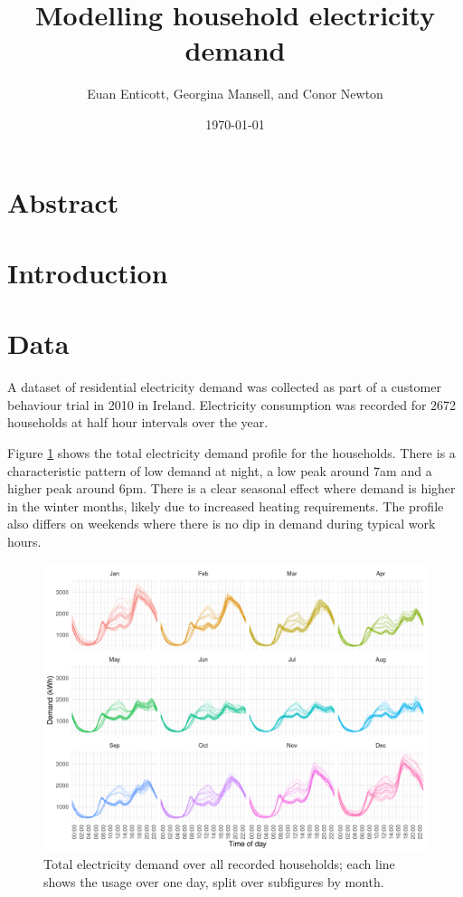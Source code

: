 \documentclass[11pt,a4paper]{article}
\begin{document}
\title{Modelling household electricity demand}
\author{Euan Enticott, Georgina Mansell, and Conor Newton}
\date{\today}

\maketitle
 
\section*{Abstract}


\section{Introduction}

\section{Data} \label{data}
A dataset of residential electricity demand was collected as part of a customer behaviour trial in 2010 in Ireland. Electricity consumption was recorded for 2672 households at half hour intervals over the year.

Figure \ref{fig:totalusage} shows the total electricity demand profile for the households. There is a characteristic pattern of low demand at night, a low peak around 7am and a higher peak around 6pm. There is a clear seasonal effect where demand is higher in the winter months, likely due to increased heating requirements. The profile also differs on weekends where there is no dip in demand during typical work hours.

\begin{figure}[ht]
\centering
\includegraphics[width=1\linewidth]{TotalUsage}
\caption{Total electricity demand over all recorded households; each line shows the usage over one day, split over subfigures by month.}
\label{fig:totalusage}
\end{figure}
\end{document}
